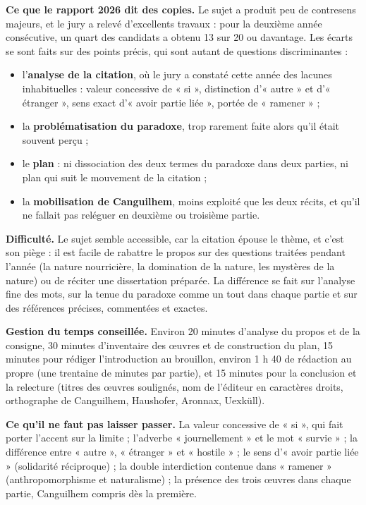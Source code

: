\documentclass[11pt,a4paper]{article}
\providecommand{\tightlist}{\setlength{\itemsep}{0pt}\setlength{\parskip}{0pt}}
\begin{document}
\textbf{Ce que le rapport 2026 dit des copies.} Le sujet a produit peu de contresens majeurs, et le jury a relevé d'excellents travaux : pour la deuxième année consécutive, un quart des candidats a obtenu 13 sur 20 ou davantage. Les écarts se sont faits sur des points précis, qui sont autant de questions discriminantes :

\begin{itemize}
\tightlist
\item
  l'\textbf{analyse de la citation}, où le jury a constaté cette année des lacunes inhabituelles : valeur concessive de « si », distinction d'« autre » et d'« étranger », sens exact d'« avoir partie liée », portée de « ramener » ;
\item
  la \textbf{problématisation du paradoxe}, trop rarement faite alors qu'il était souvent perçu ;
\item
  le \textbf{plan} : ni dissociation des deux termes du paradoxe dans deux parties, ni plan qui suit le mouvement de la citation ;
\item
  la \textbf{mobilisation de Canguilhem}, moins exploité que les deux récits, et qu'il ne fallait pas reléguer en deuxième ou troisième partie.
\end{itemize}

\textbf{Difficulté.} Le sujet semble accessible, car la citation épouse le thème, et c'est son piège : il est facile de rabattre le propos sur des questions traitées pendant l'année (la nature nourricière, la domination de la nature, les mystères de la nature) ou de réciter une dissertation préparée. La différence se fait sur l'analyse fine des mots, sur la tenue du paradoxe comme un tout dans chaque partie et sur des références précises, commentées et exactes.

\textbf{Gestion du temps conseillée.} Environ 20 minutes d'analyse du propos et de la consigne, 30 minutes d'inventaire des œuvres et de construction du plan, 15 minutes pour rédiger l'introduction au brouillon, environ 1 h 40 de rédaction au propre (une trentaine de minutes par partie), et 15 minutes pour la conclusion et la relecture (titres des œuvres soulignés, nom de l'éditeur en caractères droits, orthographe de Canguilhem, Haushofer, Aronnax, Uexküll).

\textbf{Ce qu'il ne faut pas laisser passer.} La valeur concessive de « si », qui fait porter l'accent sur la limite ; l'adverbe « journellement » et le mot « survie » ; la différence entre « autre », « étranger » et « hostile » ; le sens d'« avoir partie liée » (solidarité réciproque) ; la double interdiction contenue dans « ramener » (anthropomorphisme et naturalisme) ; la présence des trois œuvres dans chaque partie, Canguilhem compris dès la première.
\end{document}
